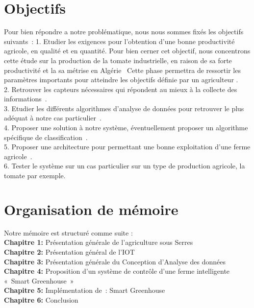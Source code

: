 \section*{Objectifs }
Pour bien répondre a notre problématique, nous nous sommes fixés les objectifs suivants : 
	1.	Etudier les exigences pour l’obtention d’une bonne productivité agricole, en qualité et en quantité. Pour bien cerner cet objectif, nous concentrons cette étude sur la production de la 
tomate industrielle, en raison de sa forte productivité et la sa métrise en Algérie  Cette phase permettra de ressortir les paramètres importants pour atteindre les objectifs définie par un agriculteur .
\\
	2.	Retrouver les capteurs nécessaires qui répondent au mieux à la collecte des informations .
\\
    3.	Etudier les différents algorithmes d’analyse de données pour retrouver le plus adéquat à notre cas particulier .
\\
    4.	Proposer une solution à notre  système, éventuellement proposer un algorithme spécifique de classification .
\\
    5.	Proposer une architecture pour permettant une bonne exploitation d’une ferme agricole .
\\
    6.	Tester le système sur un cas particulier sur un type de production agricole, la tomate par exemple.  

\section*{Organisation de mémoire }
Notre mémoire est structuré comme suite : 
\\
\textbf{Chapitre 1: }
Présentation générale de l’agriculture sous Serres
\\
\textbf{Chapitre 2: }
Présentation général de l’IOT
\\
\textbf{Chapitre 3: }
Présentation générale du Conception d’Analyse des données
\\
\textbf{Chapitre 4: }
Proposition d’un système de contrôle d’une ferme intelligente « Smart Greenhouse »  
\\
\textbf{Chapitre 5:}
Implémentation de : Smart Greenhouse
\\
\textbf{Chapitre 6:}
Conclusion